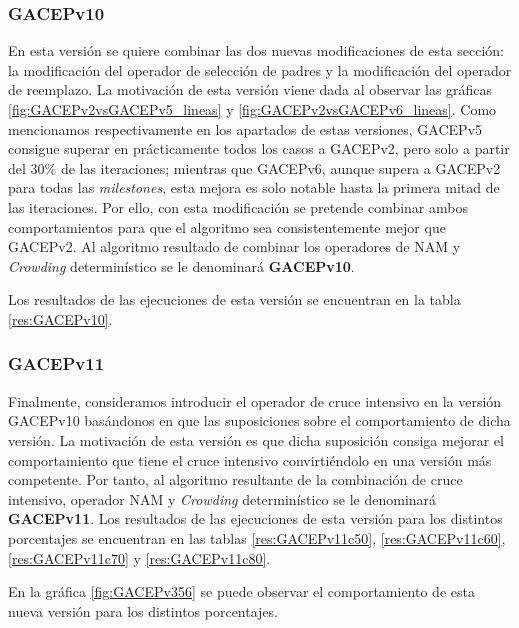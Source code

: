 \subsubsection{GACEPv10}

En esta versión se quiere combinar las dos nuevas modificaciones de esta sección: la modificación del operador de selección de padres y la modificación del operador de reemplazo. 
La motivación de esta versión viene dada al observar las gráficas \ref{fig:GACEPv2vsGACEPv5_lineas} y \ref{fig:GACEPv2vsGACEPv6_lineas}. 
Como mencionamos respectivamente en los apartados de estas versiones, GACEPv5 consigue superar en prácticamente todos los casos a GACEPv2, pero solo a partir del 30\% de las iteraciones; mientras que GACEPv6, aunque supera a GACEPv2 para todas las \textit{milestones}, esta mejora es solo notable hasta la primera mitad de las iteraciones. 
Por ello, con esta modificación se pretende combinar ambos comportamientos para que el algoritmo sea consistentemente mejor que GACEPv2. 
Al algoritmo resultado de combinar los operadores de NAM y \textit{Crowding} determinístico se le denominará \textbf{GACEPv10}. 

Los resultados de las ejecuciones de esta versión se encuentran en la tabla \ref{res:GACEPv10}.


\subsubsection{GACEPv11}

Finalmente, consideramos introducir el operador de cruce intensivo en la versión GACEPv10 basándonos en que las suposiciones sobre el comportamiento de dicha versión.%
La motivación de esta versión es que dicha suposición consiga mejorar el comportamiento que tiene el cruce intensivo convirtiéndolo en una versión más competente. 
Por tanto, al algoritmo resultante de la combinación de cruce intensivo, operador NAM y \textit{Crowding} determinístico se le denominará \textbf{GACEPv11}.
Los resultados de las ejecuciones de esta versión para los distintos porcentajes se encuentran en las tablas \ref{res:GACEPv11c50}, \ref{res:GACEPv11c60}, \ref{res:GACEPv11c70} y \ref{res:GACEPv11c80}. 

En la gráfica \ref{fig:GACEPv356} se puede observar el comportamiento de esta nueva versión para los distintos porcentajes. 

